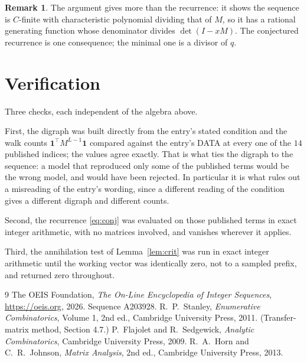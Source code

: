 \documentclass[11pt,a4paper]{article}
\theoremstyle{plain}
\theoremstyle{definition}
\newtheorem{remark}[theorem]{Remark}
\begin{document}
\begin{remark}
The argument gives more than the recurrence: it shows the sequence is $C$-finite with
characteristic polynomial dividing that of $M$, so it has a rational generating function
whose denominator divides $\det(I-xM)$. The conjectured recurrence is one consequence; the
minimal one is a divisor of $q$.
\end{remark}

\section{Verification}

Three checks, each independent of the algebra above.

First, the digraph was built directly from the entry's stated condition and the walk counts
$\mathbf{1}^{\!\top}M^{L-1}\mathbf{1}$ compared against the entry's DATA at
every one of the $14$ published indices; the values agree exactly. That is what ties
the digraph to the sequence: a model that reproduced only some of the published terms would
be the wrong model, and would have been rejected. In particular it is what rules out a
misreading of the entry's wording, since a different reading of the condition gives a
different digraph and different counts.

Second, the recurrence \eqref{eq:conj} was evaluated on those published terms in exact
integer arithmetic, with no matrices involved, and vanishes wherever it applies.

Third, the annihilation test of Lemma~\ref{lem:crit} was run in exact integer arithmetic
until the working vector was identically zero, not to a sampled prefix, and returned zero
throughout.

\begin{thebibliography}{9}
 The OEIS Foundation, \emph{The On-Line Encyclopedia of Integer
Sequences}, \url{https://oeis.org}, 2026. Sequence A203928.
 R.~P.~Stanley, \emph{Enumerative Combinatorics}, Volume 1, 2nd ed.,
Cambridge University Press, 2011. (Transfer-matrix method, Section 4.7.)
 P.~Flajolet and R.~Sedgewick, \emph{Analytic Combinatorics}, Cambridge
University Press, 2009.
 R.~A.~Horn and C.~R.~Johnson, \emph{Matrix Analysis}, 2nd ed., Cambridge
University Press, 2013.
\end{thebibliography}
\end{document}
